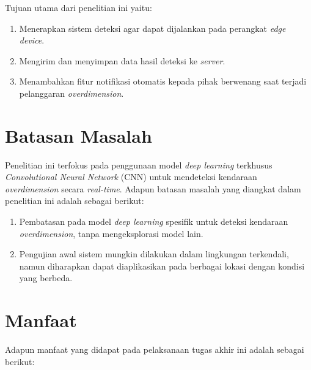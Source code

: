 Tujuan utama dari penelitian ini yaitu:

\begin{enumerate}[nolistsep]

  \item Menerapkan sistem deteksi agar dapat dijalankan pada perangkat \emph{edge device}.
  
  \item Mengirim dan menyimpan data hasil deteksi ke \emph{server}.
  
  \item Menambahkan fitur notifikasi otomatis kepada pihak berwenang saat terjadi pelanggaran \emph{overdimension}.
  
\end{enumerate}

\section{Batasan Masalah}
\label{sec:batasanmasalah}

Penelitian ini terfokus pada penggunaan model \emph{deep learning} terkhusus \emph{Convolutional Neural Network} (CNN) untuk mendeteksi kendaraan \emph{overdimension} secara \emph{real-time}. Adapun batasan masalah yang diangkat dalam penelitian ini adalah sebagai berikut:

\begin{enumerate}[nolistsep]

  \item Pembatasan pada model \emph{deep learning} spesifik untuk deteksi kendaraan \emph{overdimension}, tanpa mengeksplorasi model lain.
  
  \item Pengujian awal sistem mungkin dilakukan dalam lingkungan terkendali, namun diharapkan dapat diaplikasikan pada berbagai lokasi dengan kondisi yang berbeda.
  
\end{enumerate}

\section{Manfaat}
\label{sec:manfaatpenulisan}

Adapun manfaat yang didapat pada pelaksanaan tugas akhir ini adalah sebagai berikut:

